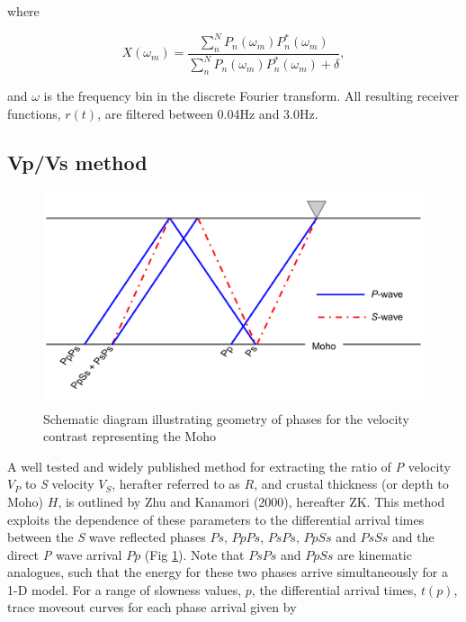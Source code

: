 \documentclass[review]{elsarticle}
\begin{document}
\noindent where

\begin{equation}
  X(\omega_m) = \frac {\sum_n^N P_n(\omega_m)P_n^*(\omega_m)} {\sum_n^N P_n(\omega_m)P_n^*(\omega_m) + \delta},
\end{equation}

\noindent and $\omega$ is the frequency bin in the discrete Fourier transform. All resulting receiver functions, $r(t)$, are filtered between 0.04Hz and 3.0Hz.



\subsection{Vp/Vs method} \label{section:VpVsMethod}

\begin{figure}
  \centering
    \includegraphics[width=\textwidth]{reflectedPhases.pdf}
  \caption{Schematic diagram illustrating geometry of phases for the velocity contrast representing the Moho}
  \label{fig:reflectedPhases}
\end{figure}


A well tested and widely published method for extracting the ratio of {\it P} velocity $V_P$ to {\it S} velocity $V_S$, herafter referred to as $R$, and crustal thickness (or depth to Moho) $H$, is outlined by Zhu and Kanamori (2000), hereafter ZK. This method exploits the dependence of these parameters to the differential arrival times between the {\it S} wave reflected phases $Ps$, $PpPs$, $PsPs$, $PpSs$ and $PsSs$ and the direct {\it P} wave arrival $Pp$ (Fig \ref{fig:reflectedPhases}). Note that $PsPs$ and $PpSs$ are kinematic analogues, such that the energy for these two phases arrive simultaneously for a 1-D model. For a range of slowness values, $p$, the differential arrival times, $t(p)$, trace moveout curves for each phase arrival given by
\end{document}
